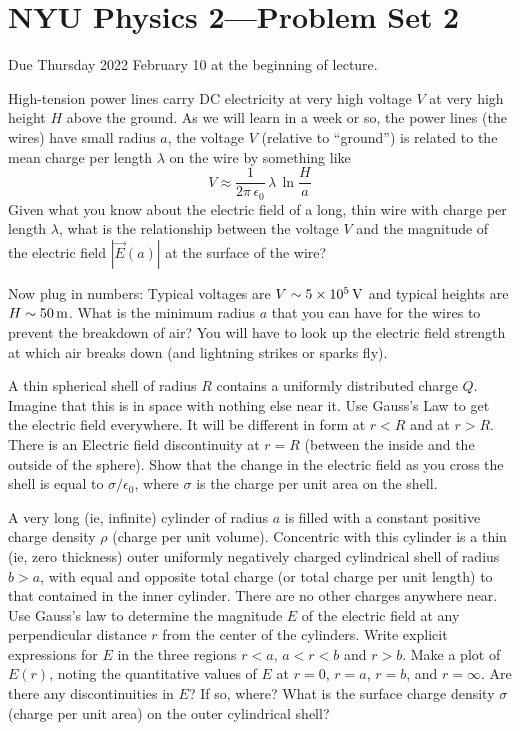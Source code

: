 \documentclass[12pt]{article}
\begin{document}
\section*{NYU Physics 2---Problem Set 2}

Due Thursday 2022 February 10 at the beginning of lecture.

\startproblem%
High-tension power lines carry DC electricity at very high voltage $V$ at
very high height $H$ above the ground.
As we will learn in a week or so,
the power lines (the wires) have small radius $a$, the voltage $V$
(relative to ``ground'') is related
to the mean charge per length $\lambda$ on the wire
by something like
\begin{equation}
  V \approx \frac{1}{2\pi\,\epsilon_0}\,\lambda\,\ln\frac{H}{a}
\end{equation}
Given what you know about the electric field of a long, thin wire with
charge per length $\lambda$,
what is the relationship between the voltage $V$ and the magnitude of the electric
field $|\vec{E}(a)|$ at the surface of the wire?

Now plug in numbers:
Typical voltages are $V\sim 5\times 10^5\,\mathrm{V}$ and typical heights are
$H\sim 50\,\mathrm{m}$.
What is the minimum radius $a$ that you can have for the wires to prevent
the breakdown of air?
You will have to look up the electric field strength at which air breaks
down (and lightning strikes or sparks fly).

\startproblem%
A thin spherical shell of radius $R$ contains a uniformly distributed
charge $Q$.  Imagine that this is in space with nothing else near
it. Use Gauss's Law to get the electric field everywhere. It will be
different in form at $r<R$ and at $r>R$. There is an Electric field
discontinuity at $r=R$ (between the inside and the outside of the sphere). Show
that the change in the electric field as you cross the shell is equal
to $\sigma/\epsilon_0$, where $\sigma$ is the charge per unit area on
the shell.

\startproblem%
A very long (ie, infinite) cylinder of radius $a$ is filled with a
constant positive charge density $\rho$ (charge per unit volume).
Concentric with this cylinder is a thin (ie, zero thickness) outer
uniformly negatively charged cylindrical shell of radius $b>a$, with
equal and opposite total charge (or total charge per unit length) to that
contained in the inner cylinder.  There are no other charges anywhere near.  Use
Gauss's law to determine the magnitude $E$ of the electric field at
any perpendicular distance $r$ from the center of the cylinders.
Write explicit expressions for $E$ in the three regions $r<a$, $a<r<b$
and $r>b$.  Make a plot of $E(r)$, noting the quantitative values of
$E$ at $r=0$, $r=a$, $r=b$, and $r=\infty$.  Are there any
discontinuities in $E$?  If so, where?  What is the surface charge
density $\sigma$ (charge per unit area) on the outer cylindrical
shell?
\end{document}

